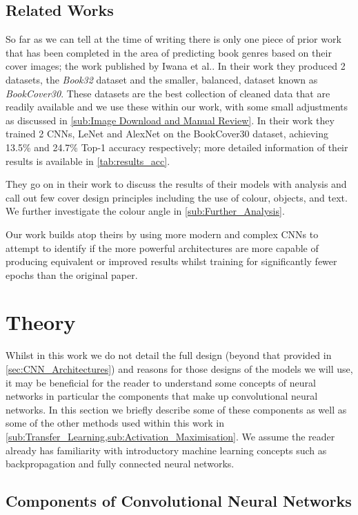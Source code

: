 \documentclass[12pt]{article}
\numberwithin{equation}{section}
\numberwithin{figure}{section}
\begin{document}
\subsection{Related Works} 
\label{sub:Related Works} 
So far as we can tell at the time of writing there is only one piece of prior work that has been completed in the area of predicting book genres based on their cover images; the work published by Iwana et al.\cite{KenjiIwana}. In their work they produced 2 datasets, the \emph{Book32} dataset and the smaller, balanced, dataset known as \emph{BookCover30}. These datasets are the best collection of cleaned data that are readily available and we use these within our work, with some small adjustments as discussed in \cref{sub:Image Download and Manual Review}. In their work they trained 2 CNNs, LeNet and AlexNet on the BookCover30 dataset, achieving 13.5\% and 24.7\% Top-1 accuracy respectively; more detailed information of their results is available in \cref{tab:results_acc}.

They go on in their work to discuss the results of their models with analysis and call out few cover design principles including the use of colour, objects, and text. We further investigate the colour angle in \cref{sub:Further_Analysis}.

Our work builds atop theirs by using more modern and complex CNNs to attempt to identify if the more powerful architectures are more capable of producing equivalent or improved results whilst training for significantly fewer epochs than the original paper.
\section{Theory} 
\label{sec:Theory} 
Whilst in this work we do not detail the full design (beyond that provided in \cref{sec:CNN_Architectures}) and reasons for those designs of the models we will use, it may be beneficial for the reader to understand some concepts of neural networks in particular the components that make up convolutional neural networks. In this section we briefly describe some of these components as well as some of the other methods used within this work in \cref{sub:Transfer_Learning,sub:Activation_Maximisation}. We assume the reader already has familiarity with introductory machine learning concepts such as backpropagation and fully connected neural networks.
\subsection{Components of Convolutional Neural Networks} 
\label{sub:Components_of_Convolutional_Neural_Networks} 
\end{document}
